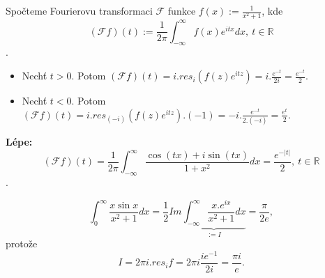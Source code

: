 \begin{example}
Spočteme Fourierovu transformaci $\mathcal{F}$ funkce $f(x):=\frac{1}{x^2+1}$, kde
$$(\mathcal{F}f)(t):=\frac{1}{2\pi}\int_{-\infty}^\infty{f(x)e^{itx}}dx, \ t\in\mathbb{R}$$.
\begin{itemize}
    \item Nechť $t>0$. Potom $(\mathcal{F}f)(t)=i.{res}_i{(f(z)e^{itz})}=i.\frac{e^{-t}}{2i}=\frac{e^{-t}}{2}$.
    \item Nechť $t<0$. Potom $(\mathcal{F}f)(t)=i.{res}_{(-i)}{(f(z)e^{itz})}.(-1)=-i.\frac{e^{-t}}{2.(-i)}=\frac{e^{t}}{2}$.
\end{itemize}
\textbf{Lépe:}
$$(\mathcal{F}f)(t)=\frac{1}{2\pi}\int_{-\infty}^\infty\frac{\cos{(tx)}+i\sin{(tx)}}{1+x^2}dx=\frac{e^{-|t|}}{2}, \ t\in\mathbb{R}$$.
\end{example}

\begin{example}
$$\int_0^\infty\frac{x\sin{x}}{x^2+1}dx=\frac{1}{2}{Im}\underset{:=I}{\underbrace{\int_{-\infty}^\infty\frac{x.e^{ix}}{x^2+1}dx}}=\frac{\pi}{2e},$$
protože
$$I=2\pi i.{res}_{i}{f}=2\pi i \frac{ie^{-1}}{2i}=\frac{\pi i}{e}.$$
\end{example}